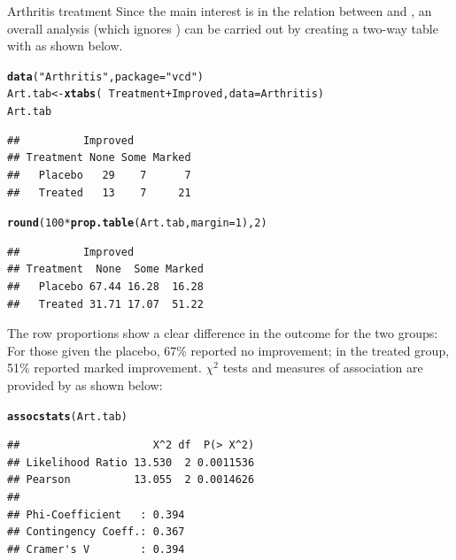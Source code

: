 \documentclass[11pt]{book}\usepackage[]{graphicx}\usepackage[]{color}
\makeatletter
\newcommand{\hlnum}[1]{\textcolor[rgb]{0.686,0.059,0.569}{#1}}%
\newcommand{\hlstr}[1]{\textcolor[rgb]{0.192,0.494,0.8}{#1}}%
\newcommand{\hlopt}[1]{\textcolor[rgb]{0,0,0}{#1}}%
\newcommand{\hlstd}[1]{\textcolor[rgb]{0.345,0.345,0.345}{#1}}%
\newcommand{\hlkwb}[1]{\textcolor[rgb]{0.69,0.353,0.396}{#1}}%
\newcommand{\hlkwc}[1]{\textcolor[rgb]{0.333,0.667,0.333}{#1}}%
\newcommand{\hlkwd}[1]{\textcolor[rgb]{0.737,0.353,0.396}{\textbf{#1}}}%
\newenvironment{kframe}{%
 \def\at@end@of@kframe{}%
 \ifinner\ifhmode%
  \def\at@end@of@kframe{\end{minipage}}%
  \begin{minipage}{\columnwidth}%
 \fi\fi%
 \def\FrameCommand##1{\hskip\@totalleftmargin \hskip-\fboxsep
 \colorbox{shadecolor}{##1}\hskip-\fboxsep
     \hskip-\linewidth \hskip-\@totalleftmargin \hskip\columnwidth}%
 \MakeFramed {\advance\hsize-\width
   \@totalleftmargin\z@ \linewidth\hsize
   \@setminipage}}%
 {\par\unskip\endMakeFramed%
 \at@end@of@kframe}
\newenvironment{knitrout}{}{} %
\renewenvironment{knitrout}{\small\renewcommand{\baselinestretch}{.85}}{} %
\makeatother
\begin{document}
\begin{Example}[arthrit2]{Arthritis treatment}
Since the main interest is in the relation between  and
, an overall analysis (which ignores ) can be carried out
by creating a two-way table with 
as shown below.
\begin{knitrout}
\color{fgcolor}\begin{kframe}
\begin{alltt}
\hlkwd{data}\hlstd{(}\hlstr{"Arthritis"}\hlstd{,} \hlkwc{package}\hlstd{=}\hlstr{"vcd"}\hlstd{)}
\hlstd{Art.tab} \hlkwb{<-} \hlkwd{xtabs}\hlstd{(}\hlopt{~}\hlstd{Treatment} \hlopt{+} \hlstd{Improved,} \hlkwc{data}\hlstd{=Arthritis)}
\hlstd{Art.tab}
\end{alltt}
\begin{verbatim}
##          Improved
## Treatment None Some Marked
##   Placebo   29    7      7
##   Treated   13    7     21
\end{verbatim}
\begin{alltt}
\hlkwd{round}\hlstd{(}\hlnum{100}\hlopt{*}\hlkwd{prop.table}\hlstd{(Art.tab,} \hlkwc{margin}\hlstd{=}\hlnum{1}\hlstd{),} \hlnum{2}\hlstd{)}
\end{alltt}
\begin{verbatim}
##          Improved
## Treatment  None  Some Marked
##   Placebo 67.44 16.28  16.28
##   Treated 31.71 17.07  51.22
\end{verbatim}
\end{kframe}
\end{knitrout}

The row proportions show a clear difference in the outcome for the two groups:
For those given the placebo, 67\% reported no improvement;
in the treated group, 51\% reported marked improvement.  $\chi^2$ tests
and measures of association are provided by  as shown below:
\begin{knitrout}
\color{fgcolor}\begin{kframe}
\begin{alltt}
\hlkwd{assocstats}\hlstd{(Art.tab)}
\end{alltt}
\begin{verbatim}
##                     X^2 df  P(> X^2)
## Likelihood Ratio 13.530  2 0.0011536
## Pearson          13.055  2 0.0014626
## 
## Phi-Coefficient   : 0.394 
## Contingency Coeff.: 0.367 
## Cramer's V        : 0.394
\end{verbatim}
\end{kframe}
\end{knitrout}

\end{Example}
\end{document}
